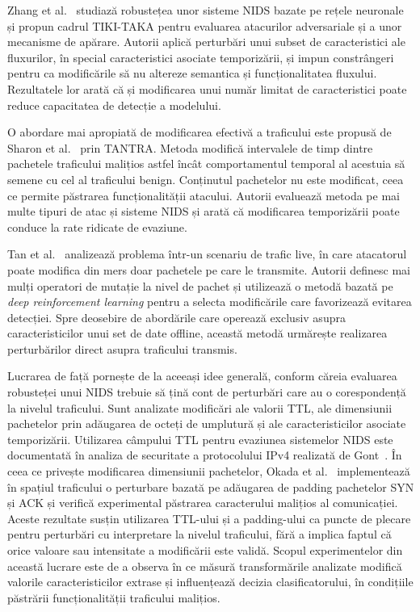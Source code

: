 Zhang et al.~\cite{zhang2022adversarial} studiază robustețea unor sisteme NIDS bazate pe rețele neuronale și propun cadrul TIKI-TAKA pentru evaluarea atacurilor adversariale și a unor mecanisme de apărare. Autorii aplică perturbări unui subset de caracteristici ale fluxurilor, în special caracteristici asociate temporizării, și impun constrângeri pentru ca modificările să nu altereze semantica și funcționalitatea fluxului. Rezultatele lor arată că și modificarea unui număr limitat de caracteristici poate reduce capacitatea de detecție a modelului.

O abordare mai apropiată de modificarea efectivă a traficului este propusă de Sharon et al.~\cite{sharon2022tantra} prin TANTRA. Metoda modifică intervalele de timp dintre pachetele traficului malițios astfel încât comportamentul temporal al acestuia să semene cu cel al traficului benign. Conținutul pachetelor nu este modificat, ceea ce permite păstrarea funcționalității atacului. Autorii evaluează metoda pe mai multe tipuri de atac și sisteme NIDS și arată că modificarea temporizării poate conduce la rate ridicate de evaziune.

Tan et al.~\cite{tan2022sneaking} analizează problema într-un scenariu de trafic live, în care atacatorul poate modifica din mers doar pachetele pe care le transmite. Autorii definesc mai mulți operatori de mutație la nivel de pachet și utilizează o metodă bazată pe \textit{deep reinforcement learning} pentru a selecta modificările care favorizează evitarea detecției. Spre deosebire de abordările care operează exclusiv asupra caracteristicilor unui set de date offline, această metodă urmărește realizarea perturbărilor direct asupra traficului transmis.

Lucrarea de față pornește de la aceeași idee generală, conform căreia evaluarea robusteței unui NIDS trebuie să țină cont de perturbări care au o corespondență la nivelul traficului. Sunt analizate modificări ale valorii TTL, ale dimensiunii pachetelor prin adăugarea de octeți de umplutură și ale caracteristicilor asociate temporizării. Utilizarea câmpului TTL pentru evaziunea sistemelor NIDS este documentată în analiza de securitate a protocolului IPv4 realizată de Gont~\cite{gont2011rfc6274}. În ceea ce privește modificarea dimensiunii pachetelor, Okada et al.~\cite{okada2025xai} implementează în spațiul traficului o perturbare bazată pe adăugarea de padding pachetelor SYN și ACK și verifică experimental păstrarea caracterului malițios al comunicației. Aceste rezultate susțin utilizarea TTL-ului și a padding-ului ca puncte de plecare pentru perturbări cu interpretare la nivelul traficului, fără a implica faptul că orice valoare sau intensitate a modificării este validă. Scopul experimentelor din această lucrare este de a observa în ce măsură transformările analizate modifică valorile caracteristicilor extrase și influențează decizia clasificatorului, în condițiile păstrării funcționalității traficului malițios.


